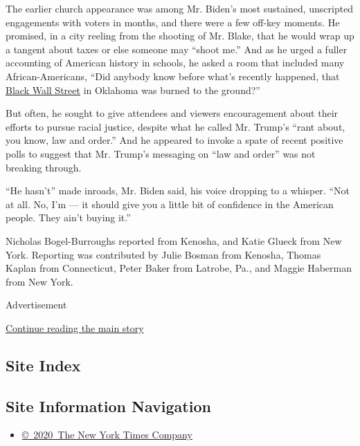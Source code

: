 The earlier church appearance was among Mr. Biden's most sustained,
unscripted engagements with voters in months, and there were a few
off-key moments. He promised, in a city reeling from the shooting of Mr.
Blake, that he would wrap up a tangent about taxes or else someone may
``shoot me.'' And as he urged a fuller accounting of American history in
schools, he asked a room that included many African-Americans, ``Did
anybody know before what's recently happened, that
\href{https://www.nytimes3xbfgragh.onion/2020/06/19/us/politics/juneteenth-tulsa-trump-rally.html}{Black
Wall Street} in Oklahoma was burned to the ground?''

But often, he sought to give attendees and viewers encouragement about
their efforts to pursue racial justice, despite what he called Mr.
Trump's ``rant about, you know, law and order.'' And he appeared to
invoke a spate of recent positive polls to suggest that Mr. Trump's
messaging on ``law and order'' was not breaking through.

``He hasn't'' made inroads, Mr. Biden said, his voice dropping to a
whisper. ``Not at all. No, I'm --- it should give you a little bit of
confidence in the American people. They ain't buying it.''

Nicholas Bogel-Burroughs reported from Kenosha, and Katie Glueck from
New York. Reporting was contributed by Julie Bosman from Kenosha, Thomas
Kaplan from Connecticut, Peter Baker from Latrobe, Pa., and Maggie
Haberman from New York.

Advertisement

\protect\hyperlink{after-bottom}{Continue reading the main story}

\hypertarget{site-index}{%
\subsection{Site Index}\label{site-index}}

\hypertarget{site-information-navigation}{%
\subsection{Site Information
Navigation}\label{site-information-navigation}}

\begin{itemize}
\tightlist
\item
  \href{https://help.nytimes3xbfgragh.onion/hc/en-us/articles/115014792127-Copyright-notice}{©~2020~The
  New York Times Company}
\end{itemize}

